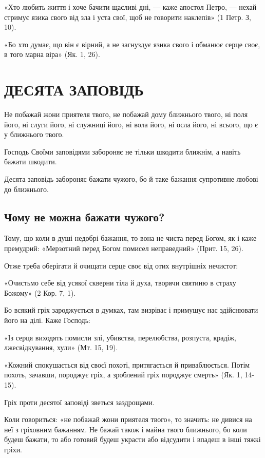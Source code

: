 \documentclass[main.tex]{subfiles}
\begin{document}
«Хто любить життя і хоче бачити щасливі дні, — каже апостол Петро, — нехай стримує язика свого від зла і уста свої, щоб не говорити наклепів» (1 Петр. З, 10).

«Бо хто думає, що він є вірний, а не загнуздує язика свого і обманює серце своє, в того марна віра» (Як. 1, 26).

\section{ДЕСЯТА ЗАПОВІДЬ}

Не побажай жони приятеля твого, не побажай дому ближнього твого, ні поля його, ні слуги його, ні служниці його, ні вола його, ні осла його, ні всього, що є у ближнього твого.

Господь Своїми заповідями забороняє не тільки шкодити ближнім, а навіть бажати шкодити.
 
Десята заповідь забороняє бажати чужого, бо й таке бажання супротивне любові до ближнього.

\subsection{Чому не можна бажати чужого?}

Тому, що коли в душі недобрі бажання, то вона не чиста перед Богом, як і каже премудрий: «Мерзотний перед Богом помисел неправедний» (Прит. 15, 26).

Отже треба оберігати й очищати серце своє від отих внутрішніх нечистот:

«Очистьмо себе від усякої скверни тіла й духа, творячи святиню в страху Божому» (2 Кор. 7, 1).

Бо всякий гріх зароджується в думках, там визріває і примушує нас здійснювати його на ділі. Каже Господь:

«Із серця виходять помисли злі, убивства, перелюбства, розпуста, крадіж, лжесвідкування, хули» (Мт. 15, 19).

«Кожний спокушається від своєї похоті, притягається й приваблюється. Потім похоть, зачавши, породжує гріх, а зроблений гріх породжує смерть» (Як. 1, 14-15).

Гріх проти десятої заповіді зветься заздрощами.

Коли говориться: «не побажай жони приятеля твого», то значить: не дивися на неї з гріховним бажанням. Не бажай також і майна твого ближнього, бо коли будеш бажати, то або готовий будеш украсти або відсудити і впадеш в інші тяжкі гріхи.
\end{document}
